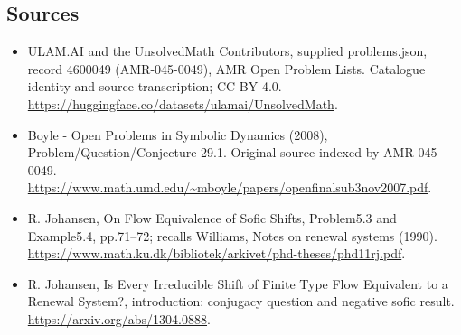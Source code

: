 \documentclass[11pt,a4paper]{article}
\begin{document}
\subsection{Sources}
\begin{itemize}
\item[S1] ULAM.AI and the UnsolvedMath Contributors, supplied problems.json, record 4600049 (AMR-045-0049), AMR Open Problem Lists. Catalogue identity and source transcription; CC BY 4.0.
\url{https://huggingface.co/datasets/ulamai/UnsolvedMath}.
\item[S2] Boyle - Open Problems in Symbolic Dynamics (2008), Problem/Question/Conjecture 29.1. Original source indexed by AMR-045-0049.
\url{https://www.math.umd.edu/~mboyle/papers/openfinalsub3nov2007.pdf}.
\item[S3] R. Johansen, On Flow Equivalence of Sofic Shifts, Problem5.3 and Example5.4, pp.71–72; recalls Williams, Notes on renewal systems (1990).
\url{https://www.math.ku.dk/bibliotek/arkivet/phd-theses/phd11rj.pdf}.
\item[S4] R. Johansen, Is Every Irreducible Shift of Finite Type Flow Equivalent to a Renewal System?, introduction: conjugacy question and negative sofic result.
\url{https://arxiv.org/abs/1304.0888}.
\end{itemize}
\end{document}
